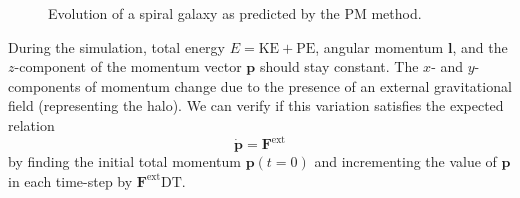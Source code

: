 \begin{figure}[!ht]
    \caption{Evolution of a spiral galaxy as predicted by the PM method.}
    \label{fig:spiral-galaxy-evolution-pm}
\end{figure}

During the simulation, total energy $E = \textrm{KE} + \textrm{PE}$, angular momentum $\mathbf{l}$, and the $z$-component of the momentum vector $\mathbf{p}$ should stay constant.
The $x$- and $y$-components of momentum change due to the presence of an external gravitational field (representing the halo).
We can verify if this variation satisfies the expected relation
\begin{equation}\label{eq:expected-momentum-change}
    \dot{\mathbf{p}} = \mathbf{F}^\text{ext}
\end{equation}
by finding the initial total momentum $\mathbf{p}(t = 0)$ and incrementing the value of $\mathbf{p}$ in each time-step by $\mathbf{F}^\text{ext}\textrm{DT}$.

